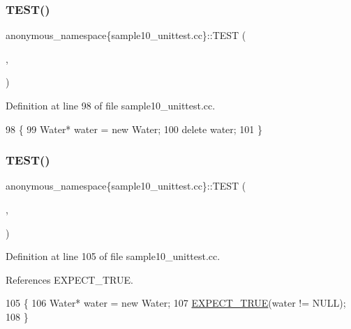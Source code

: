 \subsubsection{\texorpdfstring{T\+E\+S\+T()}{TEST()}\hspace{0.1cm}{\footnotesize\ttfamily [1/2]}}
{\footnotesize\ttfamily anonymous\+\_\+namespace\{sample10\+\_\+unittest.\+cc\}\+::T\+E\+ST (\begin{DoxyParamCaption}\item[{Listeners\+Test}]{,  }\item[{Does\+Not\+Leak}]{ }\end{DoxyParamCaption})}



Definition at line 98 of file sample10\+\_\+unittest.\+cc.


\begin{DoxyCode}
98                                  \{
99   Water* water = \textcolor{keyword}{new} Water;
100   \textcolor{keyword}{delete} water;
101 \}
\end{DoxyCode}
\mbox{\label{namespaceanonymous__namespace_02sample10__unittest_8cc_03_ace894bb8dc5a7491b185e75cf4989800}} 
\subsubsection{\texorpdfstring{T\+E\+S\+T()}{TEST()}\hspace{0.1cm}{\footnotesize\ttfamily [2/2]}}
{\footnotesize\ttfamily anonymous\+\_\+namespace\{sample10\+\_\+unittest.\+cc\}\+::T\+E\+ST (\begin{DoxyParamCaption}\item[{Listeners\+Test}]{,  }\item[{Leaks\+Water}]{ }\end{DoxyParamCaption})}



Definition at line 105 of file sample10\+\_\+unittest.\+cc.



References E\+X\+P\+E\+C\+T\+\_\+\+T\+R\+UE.


\begin{DoxyCode}
105                                 \{
106   Water* water = \textcolor{keyword}{new} Water;
107   \hyperlink{gtest_8h_ac33e7cdfb5d44a7a0f0ab552eb5c3c6a}{EXPECT\_TRUE}(water != NULL);
108 \}
\end{DoxyCode}

